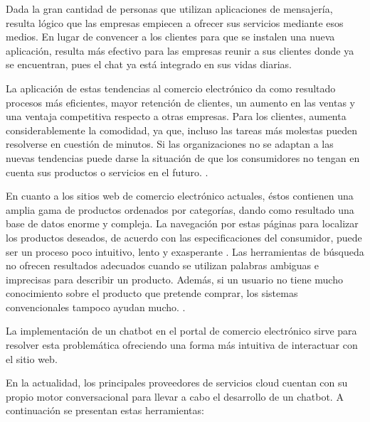 Dada la gran cantidad de personas que utilizan aplicaciones de mensajería, resulta lógico que las empresas empiecen a ofrecer sus servicios mediante esos medios. En lugar de convencer a los clientes para que se instalen una nueva aplicación, resulta más efectivo para las empresas reunir a sus clientes donde ya se encuentran, pues el chat ya está integrado en sus vidas diarias. 

La aplicación de estas tendencias al comercio electrónico da como resultado procesos más eficientes, mayor retención de clientes, un aumento en las ventas y una ventaja competitiva respecto a otras empresas. Para los clientes, aumenta considerablemente la comodidad, ya que, incluso las tareas más molestas pueden resolverse en cuestión de minutos. Si las organizaciones no se adaptan a las nuevas tendencias puede darse la situación de que los consumidores no tengan en cuenta sus productos o servicios en el futuro. \cite{peterAI}.

En cuanto a los sitios web de comercio electrónico actuales, éstos contienen una amplia gama de productos ordenados por categorías, dando como resultado una base de datos enorme y compleja. La navegación por estas páginas para localizar los productos deseados, de acuerdo con las especificaciones del consumidor, puede ser un proceso poco intuitivo, lento y exasperante \cite{Gupta2015AnEW}. Las herramientas de búsqueda no ofrecen resultados adecuados cuando se utilizan palabras ambiguas e imprecisas para describir un producto. Además, si un usuario no tiene mucho conocimiento sobre el producto que pretende comprar, los sistemas convencionales tampoco ayudan mucho. \cite{Gupta2015AnEW}. 
 
La implementación de un chatbot en el portal de comercio electrónico sirve para resolver esta problemática ofreciendo una forma más intuitiva de interactuar con el sitio web.

En la actualidad, los principales proveedores de servicios cloud cuentan con su propio motor conversacional para llevar a cabo el desarrollo de un chatbot. A continuación se presentan estas herramientas:

